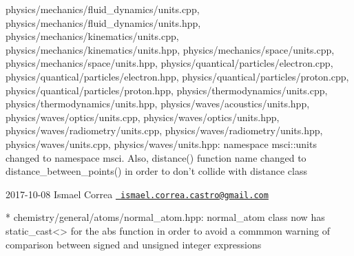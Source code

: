\begin{DoxyVerb}
physics/mechanics/fluid_dynamics/units.cpp,
physics/mechanics/fluid_dynamics/units.hpp,
physics/mechanics/kinematics/units.cpp,
physics/mechanics/kinematics/units.hpp,
physics/mechanics/space/units.cpp,
physics/mechanics/space/units.hpp,
physics/quantical/particles/electron.cpp,
physics/quantical/particles/electron.hpp,
physics/quantical/particles/proton.cpp,
physics/quantical/particles/proton.hpp,
physics/thermodynamics/units.cpp, physics/thermodynamics/units.hpp,
physics/waves/acoustics/units.hpp, physics/waves/optics/units.cpp,
physics/waves/optics/units.hpp, physics/waves/radiometry/units.cpp,
physics/waves/radiometry/units.hpp, physics/waves/units.cpp,
physics/waves/units.hpp: namespace msci::units changed to namespace
msci. Also, distance() function name changed to
distance_between_points() in order to don't collide with distance
class
\end{DoxyVerb}
 2017-\/10-\/08 Ismael Correa \href{mailto:ismael.correa.castro@gmail.com}{\texttt{ ismael.\+correa.\+castro@gmail.\+com}} \begin{DoxyVerb}* chemistry/general/atoms/normal_atom.hpp: normal_atom class now has
static_cast<> for the abs function in order to avoid a commmon
warning of comparison between signed and unsigned integer
expressions
\end{DoxyVerb}
